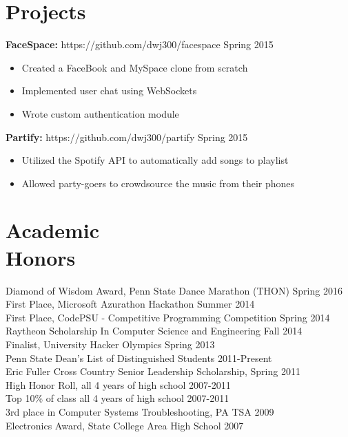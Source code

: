 \documentclass[margin]{res}
\begin{document}
\begin{resume}
\section{Projects}
{\bf FaceSpace:} https://github.com/dwj300/facespace \hfill Spring 2015
\begin{itemize} \itemsep -2pt %
\item Created a FaceBook and MySpace clone from scratch
\item Implemented user chat using WebSockets
\item Wrote custom authentication module
\end{itemize}
{\bf Partify:} https://github.com/dwj300/partify \hfill Spring 2015    
\begin{itemize} \itemsep -2pt %
\item Utilized the Spotify API to automatically add songs to playlist
\item Allowed party-goers to crowdsource the music from their phones
\end{itemize}

\section{Academic \\ Honors}
Diamond of Wisdom Award, Penn State Dance Marathon (THON) \hfill Spring 2016\\
First Place, Microsoft Azurathon Hackathon \hfill Summer 2014\\
First Place, CodePSU - Competitive Programming Competition  \hfill Spring 2014\\
Raytheon Scholarship In Computer Science and Engineering \hfill Fall 2014\\
Finalist, University Hacker Olympics \hfill Spring 2013\\
Penn State Dean's List of Distinguished Students \hfill 2011-Present \\
Eric Fuller Cross Country Senior Leadership Scholarship, \hfill Spring 2011 \\
High Honor Roll, all 4 years of high school \hfill 2007-2011 \\
Top 10\% of class all 4 years of high school \hfill 2007-2011 \\
3rd place in Computer Systems Troubleshooting, PA TSA \hfill 2009 \\
Electronics Award, State College Area High School \hfill 2007


\end{resume}
\end{document}
